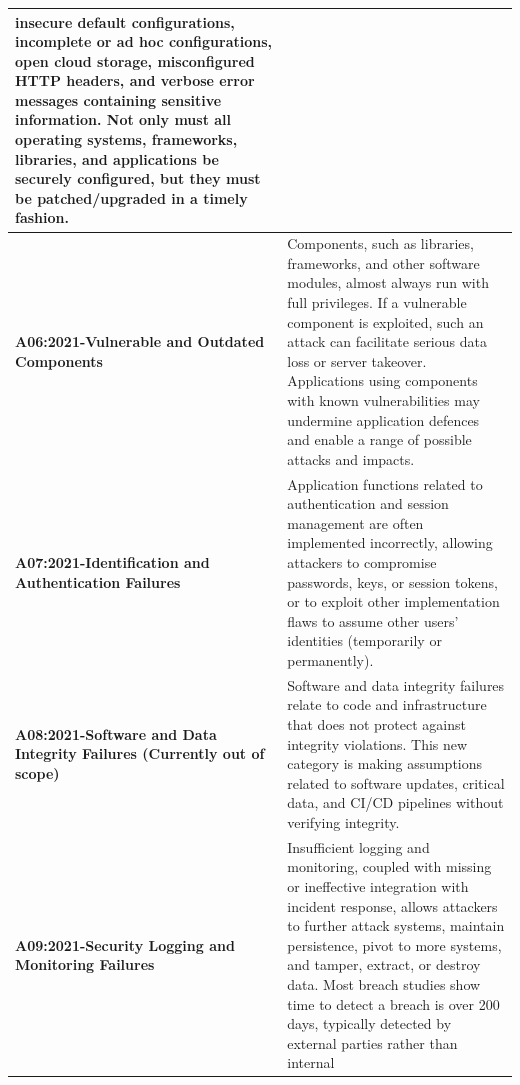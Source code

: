 \documentclass{article}
\begin{document}
\begin{center}
\begin{longtable} {|p{9em}|p{30em}|}
                insecure default configurations, incomplete or ad hoc configurations, open cloud storage,
                misconfigured HTTP headers, and verbose error messages containing sensitive
                information. Not only must all operating systems, frameworks, libraries, and applications
                be securely configured, but they must be patched/upgraded in a timely fashion. \\
                \hline
                \normalsize \textbf{A06:2021-Vulnerable and Outdated Components} & 
                \normalsize Components, such as libraries, frameworks, and other software modules, almost always
                run with full privileges. If a vulnerable component is exploited, such an attack can facilitate
                serious data loss or server takeover. Applications using components with known
                vulnerabilities may undermine application defences and enable a range of possible attacks
                and impacts. \\
                \hline
                \normalsize \textbf{A07:2021-Identification and Authentication Failures} & 
                \normalsize Application functions related to authentication and session management are often
                implemented incorrectly, allowing attackers to compromise passwords, keys, or session
                tokens, or to exploit other implementation flaws to assume other users' identities
                (temporarily or permanently). \\
                \hline
                \normalsize \textbf{A08:2021-Software and Data Integrity Failures (Currently out of scope)} & 
                \normalsize Software and data integrity failures relate to code and infrastructure that does not protect
                against integrity violations. This new category is making assumptions related to software
                updates, critical data, and CI/CD pipelines without verifying integrity. \\
                \hline
                \normalsize \textbf{A09:2021-Security Logging and Monitoring Failures} & 
                \normalsize Insufficient logging and monitoring, coupled with missing or ineffective integration with
                incident response, allows attackers to further attack systems, maintain persistence, pivot
                to more systems, and tamper, extract, or destroy data. Most breach studies show time to
                detect a breach is over 200 days, typically detected by external parties rather than internal

\end{longtable}
\end{center}
\end{document}
